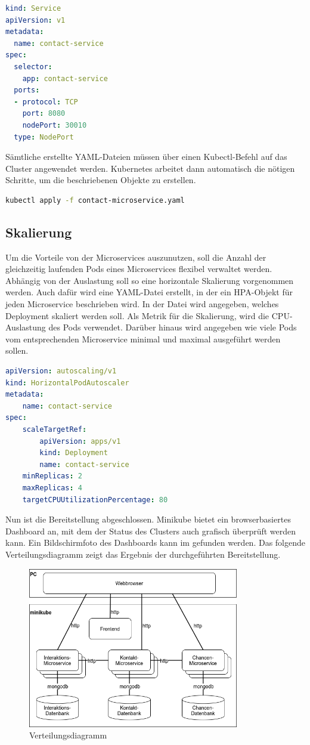 \begin{lstlisting}[language=YAML, caption=Service-Objekt vom Kontakt-Microservice, captionpos=b]
kind: Service
apiVersion: v1
metadata:
  name: contact-service
spec:
  selector:
    app: contact-service
  ports:
  - protocol: TCP
    port: 8080
    nodePort: 30010
  type: NodePort
\end{lstlisting}

Sämtliche erstellte YAML-Dateien müssen über einen Kubectl-Befehl auf das Cluster angewendet werden. Kubernetes arbeitet dann automatisch die nötigen Schritte, um die beschriebenen Objekte zu erstellen.

\begin{lstlisting}[language=bash, caption=Kubectl-Befehl für das Anwenden einer YAML-Datei, captionpos=b]
kubectl apply -f contact-microservice.yaml
\end{lstlisting}

\subsection{Skalierung}
Um die Vorteile von der Microservices auszunutzen, soll die Anzahl der gleichzeitig laufenden Pods eines Microservices flexibel verwaltet werden. Abhängig von der Auslastung soll so eine horizontale Skalierung vorgenommen werden. Auch dafür wird eine YAML-Datei erstellt, in der ein \ac{HPA}-Objekt für jeden Microservice beschrieben wird. In der Datei wird angegeben, welches Deployment skaliert werden soll. Als Metrik für die Skalierung, wird die CPU-Auslastung des Pods verwendet. Darüber hinaus wird angegeben wie viele Pods vom entsprechenden Microservice minimal und maximal ausgeführt werden sollen.

\begin{lstlisting}[language=YAML, caption=HPA-Objekt vom Kontakt-Microservice, captionpos=b]
apiVersion: autoscaling/v1
kind: HorizontalPodAutoscaler
metadata:
    name: contact-service
spec:
    scaleTargetRef:
        apiVersion: apps/v1
        kind: Deployment
        name: contact-service
    minReplicas: 2
    maxReplicas: 4
    targetCPUUtilizationPercentage: 80
\end{lstlisting}

Nun ist die Bereitstellung abgeschlossen. Minikube bietet ein browserbasiertes Dashboard an, mit dem der Status des Clusters auch grafisch überprüft werden kann. Ein Bildschirmfoto des Dashboards kann im  gefunden werden. Das folgende Verteilungsdiagramm zeigt das Ergebnis der durchgeführten Bereitstellung.

\begin{figure}[H] 
    \centering
    \includegraphics[width=0.82\textwidth]{figures/Verteilungsdiagramm.png}
    \caption{Verteilungsdiagramm}
\end{figure}
